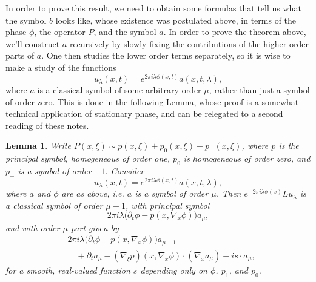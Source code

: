 \documentclass{article}
\theoremstyle{plain}
\newtheorem{lemma}[theorem]{Lemma}
\theoremstyle{remark}
\theoremstyle{definition}
\begin{document}
In order to prove this result, we need to obtain some formulas that tell us what the symbol $b$ looks like, whose existence was postulated above, in terms of the phase $\phi$, the operator $P$, and the symbol $a$. In order to prove the theorem above, we'll construct $a$ recursively by slowly fixing the contributions of the higher order parts of $a$. One then studies the lower order terms separately, so it is wise to make a study of the functions
%
\[ u_\lambda(x,t) = e^{2 \pi i \lambda \phi(x,t)} a(x,t,\lambda),\]
%
where $a$ is a classical symbol of some arbitrary order $\mu$, rather than just a symbol of order zero. This is done in the following Lemma, whose proof is a somewhat technical application of stationary phase, and can be relegated to a second reading of these notes.

\begin{lemma}
	Write $P(x,\xi) \sim p(x,\xi) + p_0(x,\xi) + p_-(x,\xi)$, where $p$ is the principal symbol, homogeneous of order one, $p_0$ is homogeneous of order zero, and $p_-$ is a symbol of order $-1$. Consider
	\[ u_\lambda(x,t) = e^{2 \pi i \lambda \phi(x,t)} a(x,t,\lambda), \]
	where $a$ and $\phi$ are as above, i.e. $a$ is a symbol of order $\mu$. Then $e^{-2 \pi i \lambda \phi(x)} L u_\lambda$ is a classical symbol of order $\mu+1$, with principal symbol
	\[ 2\pi i \lambda \Big( \partial_t \phi - p \left( x, \nabla_x \phi \right) \Big) a_\mu, \]
	and with order $\mu$ part given by
	\begin{align*}
		&2 \pi i \lambda \Big( \partial_t \phi - p \left( x, \nabla_x \phi \right) \Big) a_{\mu - 1}\\
		&\quad + \partial_t a_\mu -  (\nabla_\xi p)(x, \nabla_x \phi) \cdot (\nabla_x a_\mu) - i s \cdot a_\mu,
	\end{align*}
	for a smooth, real-valued function $s$ depending only on $\phi$, $p_1$, and $p_0$.
\end{lemma}
\end{document}

